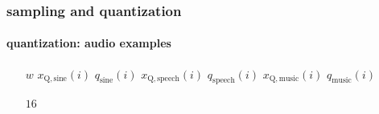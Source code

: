 	\begin{frame}\frametitle{sampling and quantization}\framesubtitle{quantization: audio examples}
        \begin{footnotesize}
        \begin{itemize}
            \item[$w$]  $x_\mathrm{Q,sine}(i)$ \hspace{1mm} $q_\mathrm{sine}(i)$ \hspace{1mm} $x_\mathrm{Q,speech}(i)$ \hspace{1mm} $q_\mathrm{speech}(i)$ \hspace{1mm} $x_\mathrm{Q,music}(i)$ \hspace{1mm} $q_\mathrm{music}(i)$
            \item[$16$]  \hspace{6mm}   \hspace{4mm}
                      \hspace{8mm}  \hspace{7mm}
                      \hspace{7mm}  


\end{itemize}
\end{footnotesize}
\end{frame}
